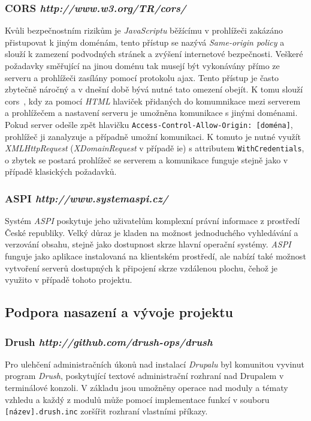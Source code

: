 \subsubsection*{\textbf{CORS} \hfill \emph{http://www.w3.org/TR/cors/}} 
Kvůli bezpečnostním rizikům je \emph{JavaScriptu} běžícímu v prohlížeči zakázáno přistupovat k jiným doménám, tento přístup se nazývá \emph{Same-origin policy} a slouží k zamezení podvodných stránek a zvýšení internetové bezpečnosti. Veškeré požadavky směřující na jinou doménu tak musejí být vykonávány přímo ze serveru a prohlížeči zasílány pomocí protokolu \gls{ajax}. Tento přístup je často zbytečně náročný a v dnešní době bývá nutné tato omezení obejít. K tomu slouží \gls{cors}~\cite{website:cors}, kdy za pomocí \emph{HTML} hlaviček přidaných do komumnikace mezi serverem a prohlížečem a nastavení serveru je umožněna komunikace s jinými doménami. Pokud server odešle zpět hlavičku \texttt{Access-Control-Allow-Origin: [doména]}, prohlížeč ji zanalyzuje a případně umožní komunikaci. K tomuto je nutné využít \emph{XMLHttpRequest} (\emph{XDomainRequest} v případě \gls{ie}) s attributem \texttt{WithCredentials}, o zbytek se postará prohlížeč se serverem a komunikace funguje stejně jako v případě klasických požadavků.

\subsubsection*{\textbf{ASPI} \hfill \emph{http://www.systemaspi.cz/}}
Systém \emph{ASPI} poskytuje jeho uživatelům komplexní právní informace z prostředí České republiky. Velký důraz je kladen na možnost jednoduchého vyhledávání a verzování obsahu, stejně jako dostupnost skrze hlavní operační systémy. \emph{ASPI} funguje jako aplikace instalovaná na klientském prostředí, ale nabízí také možnost vytvoření serverů dostupných k připojení skrze vzdálenou plochu, čehož je využito v případě tohoto projektu.

\subsection{Podpora nasazení a vývoje projektu}

\subsubsection*{\textbf{Drush} \hfill \emph{http://github.com/drush-ops/drush}}
\label{subsec:drush}
Pro ulehčení administračních úkonů nad instalací \emph{Drupalu} byl komunitou vyvinut program \emph{Drush}, poskytující textové administrační rozhraní nad Drupalem v terminálové konzoli. V základu jsou umožněny operace nad moduly a tématy vzhledu a každý z modulů může pomocí implementace funkcí v souboru \texttt{[název].drush.inc} zoršířit rozhraní vlastními příkazy.

